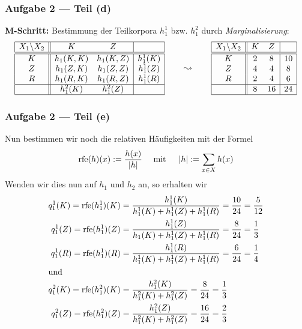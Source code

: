\documentclass{beamer}
\DeclareMathOperator{\rfe}{rfe}
\begin{document}
\begin{frame} \frametitle{Aufgabe 2 --- Teil (d)}
	\justifying \footnotesize
	\textbf{M-Schritt:} Bestimmung der Teilkorpora $h_1^1$ bzw. $h_1^2$ durch \textit{Marginalisierung}:
	\pause
	\begin{equation*}
		\begin{array}{|c||cc|c|}
		\hline
		X_1 \backslash X_2 & K & Z & \\ \hline \hline
		K & h_1(K,K) & h_1(K,Z) & h_1^1(K) \\
		Z & h_1(Z,K) & h_1(Z,Z) & h_1^1(Z) \\
		R & h_1(R,K) & h_1(R,Z) & h_1^1(R) \\ \hline
		& h_1^2(K) & h_1^2(Z) & \\ \hline
		\end{array}
		\qquad \leadsto \qquad 
		\begin{array}{|c||cc|c|}
		\hline
		X_1 \backslash X_2 & K & Z & \\ \hline \hline
		K & 2 &  8 & 10 \\
		Z & 4 &  4 &  8 \\
		R & 2 &  4 &  6 \\ \hline
		& 8 & 16 & 24 \\ \hline
		\end{array}
	\end{equation*}
\end{frame}

\begin{frame} \frametitle{Aufgabe 2 --- Teil (e)}
	\justifying \footnotesize
	Nun bestimmen wir noch die relativen Häufigkeiten mit der Formel
	\begin{equation*}
		\rfe(h)(x) \defeq \frac{h(x)}{\abs{h}} \quad \mit \quad \abs{h} \defeq \sum_{x \in X} h(x)
	\end{equation*}
	\pause
	Wenden wir dies nun auf $h_1$ und $h_2$ an, so erhalten wir
	\begin{align*}
		q_1^1(K) = \rfe(h_1^1)(K) &= \frac{h_1^1(K)}{h_1^1(K) + h_1^1(Z) + h_1^1(R)} = \frac{10}{24} = \frac{5}{12} \\
		q_1^1(Z) = \rfe(h_1^1)(Z) &= \frac{h_1^1(Z)}{h_1(K) + h_1^1(Z) + h_1^1(R)} = \frac{8}{24} = \frac{1}{3} \\
		q_1^1(R) = \rfe(h_1^1)(R) &= \frac{h_1^1(R)}{h_1^1(K) + h_1^1(Z) + h_1^1(R)} = \frac{6}{24} = \frac{1}{4} \\
		\intertext{und}
		q_1^2(K) = \rfe(h_1^2)(K) &= \frac{h_1^2(K)}{h_1^2(K) + h_1^2(Z)} = \frac{8}{24} = \frac{1}{3} \\
		q_1^2(Z) = \rfe(h_1^2)(Z) &= \frac{h_1^2(Z)}{h_1^2(K) + h_1^2(Z)} = \frac{16}{24} = \frac{2}{3} \\
	\end{align*}
\end{frame}
\end{document}
